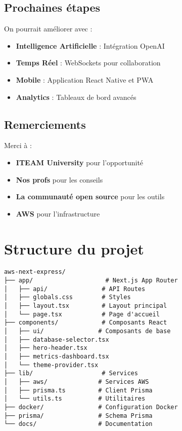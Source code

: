 \documentclass[12pt,a4paper]{report}
\begin{document}
\section{Prochaines étapes}

On pourrait améliorer avec :

\begin{itemize}
    \item \textbf{Intelligence Artificielle} : Intégration OpenAI
    \item \textbf{Temps Réel} : WebSockets pour collaboration
    \item \textbf{Mobile} : Application React Native et PWA
    \item \textbf{Analytics} : Tableaux de bord avancés
\end{itemize}

\section{Remerciements}

Merci à :
\begin{itemize}
    \item \textbf{ITEAM University} pour l'opportunité
    \item \textbf{Nos profs} pour les conseils
    \item \textbf{La communauté open source} pour les outils
    \item \textbf{AWS} pour l'infrastructure
\end{itemize}

\appendix

\chapter{Structure du projet}

\begin{verbatim}
aws-next-express/
├── app/                    # Next.js App Router
│   ├── api/               # API Routes
│   ├── globals.css        # Styles
│   ├── layout.tsx         # Layout principal
│   └── page.tsx           # Page d'accueil
├── components/            # Composants React
│   ├── ui/               # Composants de base
│   ├── database-selector.tsx
│   ├── hero-header.tsx
│   ├── metrics-dashboard.tsx
│   └── theme-provider.tsx
├── lib/                   # Services
│   ├── aws/              # Services AWS
│   ├── prisma.ts         # Client Prisma
│   └── utils.ts          # Utilitaires
├── docker/               # Configuration Docker
├── prisma/               # Schema Prisma
└── docs/                 # Documentation
\end{verbatim}
\end{document}
